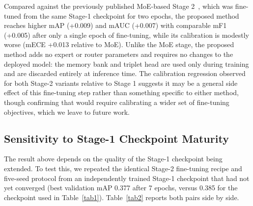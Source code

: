 \documentclass[conference]{IEEEtran}
\begin{document}
Compared against the previously published MoE-based Stage 2~\cite{b12}, which was fine-tuned from the same Stage-1 checkpoint for two epochs, the proposed method reaches higher mAP (+0.009) and mAUC (+0.007) with comparable mF1 (+0.005) after only a single epoch of fine-tuning, while its calibration is modestly worse (mECE +0.013 relative to MoE). Unlike the MoE stage, the proposed method adds no expert or router parameters and requires no changes to the deployed model: the memory bank and triplet head are used only during training and are discarded entirely at inference time. The calibration regression observed for both Stage-2 variants relative to Stage 1 suggests it may be a general side effect of this fine-tuning step rather than something specific to either method, though confirming that would require calibrating a wider set of fine-tuning objectives, which we leave to future work.

\subsection{Sensitivity to Stage-1 Checkpoint Maturity}
The result above depends on the quality of the Stage-1 checkpoint being extended. To test this, we repeated the identical Stage-2 fine-tuning recipe and five-seed protocol from an independently trained Stage-1 checkpoint that had not yet converged (best validation mAP 0.377 after 7 epochs, versus 0.385 for the checkpoint used in Table~\ref{tab1}). Table~\ref{tab2} reports both pairs side by side.

\begin{table}[htbp]
\caption{Stage-2 (proposed) applied to two independently trained Stage-1 checkpoints of different maturity. Stage-2 rows are mean $\pm$ sample standard deviation over the same 5 seeds used in Table~\ref{tab1}, with the original implementation (Section~\ref{sec:corrections}).}
\begin{center}
\label{tab2}
\end{center}
\end{table}
\end{document}
